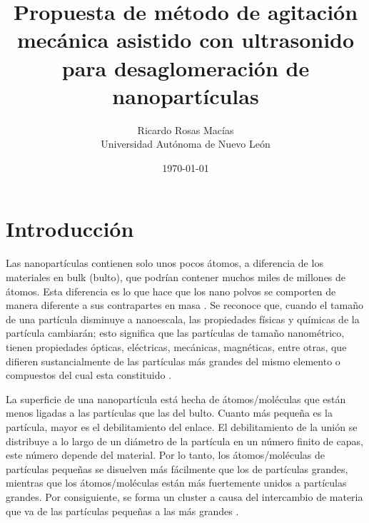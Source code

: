 \documentclass[12pt, letterpaper] {article}
\author{Ricardo Rosas Macías \\[0.9mm] Universidad Autónoma de Nuevo León}
\title{Propuesta de método de agitación mecánica asistido con ultrasonido para desaglomeración de nanopartículas}
\date{\today}
\begin{document}

\section{Introducción}

Las nanopartículas contienen solo unos pocos átomos, a diferencia de los materiales en bulk (bulto), que podrían contener muchos miles de millones de átomos. Esta diferencia es lo que hace que los nano polvos se comporten de manera diferente a sus contrapartes en masa \cite{RINyN}. Se reconoce que, cuando el tamaño de una partícula disminuye a nanoescala, las propiedades físicas y químicas de la partícula cambiarán; esto significa que las partículas de tamaño nanométrico, tienen propiedades ópticas, eléctricas, mecánicas, magnéticas, entre otras, que difieren sustancialmente de las partículas más grandes del mismo elemento o compuestos del cual esta constituido \cite{BN}.

La superficie de una nanopartícula está hecha de átomos/moléculas que están menos ligadas a las partículas que las del bulto. Cuanto más pequeña es la partícula, mayor es el debilitamiento del enlace. El debilitamiento de la unión se distribuye a lo largo de un diámetro de la partícula en un número finito de capas, este número depende del material. Por lo tanto, los átomos/moléculas de partículas pequeñas se disuelven más fácilmente que los de partículas grandes, mientras que los átomos/moléculas están más fuertemente unidos a partículas grandes. Por consiguiente, se forma un cluster a causa del intercambio de materia que va de las partículas pequeñas a las más grandes \cite{BNNP}. 
\end{document}
